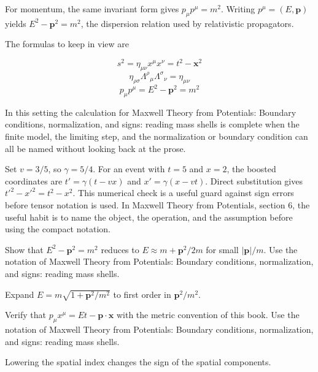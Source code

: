 For momentum, the same invariant form gives \(p_\mu p^\mu=m^2\).  Writing \(p^\mu=(E,\bm p)\) yields \(E^2-\bm p^2=m^2\), the dispersion relation used by relativistic propagators.

The formulas to keep in view are

\[
  s^2=\eta_{\mu\nu}x^\mu x^\nu=t^2-\bm x^2
\]
\[
  \eta_{\rho\sigma}\Lambda^\rho{}_\mu\Lambda^\sigma{}_\nu=\eta_{\mu\nu}
\]
\[
  p_\mu p^\mu=E^2-\bm p^2=m^2
\]

In this setting the calculation for Maxwell Theory from Potentials: Boundary conditions, normalization, and signs: reading mass shells is complete when the finite model, the limiting step, and the normalization or boundary condition can all be named without looking back at the prose.




\begin{example}
Set \(v=3/5\), so \(\gamma=5/4\).  For an event with \(t=5\) and \(x=2\), the boosted coordinates are \(t'=\gamma(t-vx)\) and \(x'=\gamma(x-vt)\).  Direct substitution gives \(t'^2-x'^2=t^2-x^2\).  This numerical check is a useful guard against sign errors before tensor notation is used.  In Maxwell Theory from Potentials, section 6, the useful habit is to name the object, the operation, and the assumption before using the compact notation.
\end{example}



\begin{exercise}
Show that \(E^2-\bm p^2=m^2\) reduces to \(E\approx m+\bm p^2/2m\) for small \(|\bm p|/m\).  Use the notation of Maxwell Theory from Potentials: Boundary conditions, normalization, and signs: reading mass shells.
\begin{answer}
Expand \(E=m\sqrt{1+\bm p^2/m^2}\) to first order in \(\bm p^2/m^2\).
\end{answer}
\end{exercise}

\begin{exercise}
Verify that \(p_\mu x^\mu=Et-\bm p\cdot\bm x\) with the metric convention of this book.  Use the notation of Maxwell Theory from Potentials: Boundary conditions, normalization, and signs: reading mass shells.
\begin{answer}
Lowering the spatial index changes the sign of the spatial components.
\end{answer}
\end{exercise}



